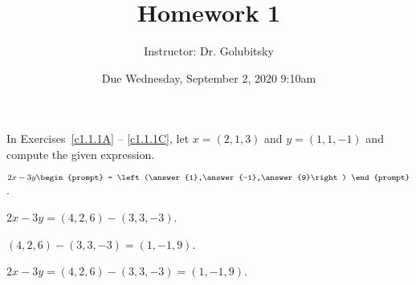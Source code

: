 \documentclass{article}
\title{Homework 1}
\author{Instructor: Dr. Golubitsky}
\date{Due Wednesday, September 2, 2020 \@ 9:10am}
\begin{document}
\maketitle


\problemlabel

\noindent In Exercises~\ref{c1.1.1A} -- \ref{c1.1.1C}, let $x=(2,1,3)$ and 
$y=(1,1,-1)$ and compute the given expression.


\begin{exercise}  \label{c1.1.1B}
  $2x-3y\begin{prompt}
    = \left(\answer{1},\answer{-1},\answer{9}\right)
  \end{prompt}$.
  \begin{hint}
    $2x - 3y = (4,2,6) - (3,3,-3)$.
  \end{hint}
  \begin{hint}
    $(4,2,6) - (3,3,-3) = (1,-1,9)$.
  \end{hint}  

\begin{solution}
\ans $2x - 3y = (4,2,6) - (3,3,-3) = (1,-1,9)$.

\end{solution}
\end{exercise}





\problemlabel
\end{document}

